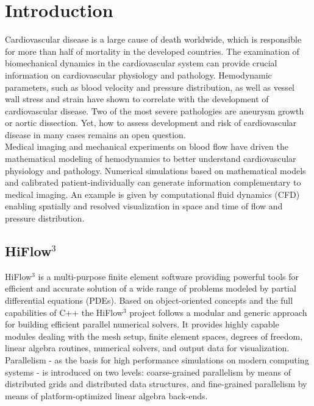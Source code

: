 \documentclass[a4paper, 11pt, twoside]{article}
\begin{document}
\pagestyle{empty}


\tableofcontents

\newpage
\pagestyle{plain}
\vspace{0.5cm}
\section{Introduction}
Cardiovascular disease is a large cause of death worldwide,
which is responsible for more than half of mortality in the developed
countries. The examination of biomechanical dynamics in the
cardiovascular system can provide crucial information on cardiovascular
physiology and pathology. Hemodynamic parameters, such as blood velocity
and pressure distribution, as well as vessel wall stress and strain have
shown to correlate with the development of cardiovascular disease. Two
of the most severe pathologies are aneurysm growth or aortic dissection.
Yet, how to assess development and risk of cardiovascular disease in
many cases remains an open question.\\

Medical imaging and mechanical experiments on blood flow have driven the
mathematical modeling of hemodynamics to better understand
cardiovascular physiology and pathology. Numerical simulations based on
mathematical models and calibrated patient-individually can generate
information complementary to medical imaging. An example is
given by computational fluid dynamics (CFD) enabling spatially and resolved visualization
in space and time of flow and pressure distribution.

\subsection{HiFlow$^3$}
HiFlow$^3$ is a multi-purpose finite element software providing powerful tools for efficient and accurate solution of 
a wide range of problems modeled by partial differential equations (PDEs). Based on object-oriented concepts and the full
capabilities of C++ the HiFlow$^3$ project follows a modular and generic approach for building efficient parallel 
numerical solvers. It provides highly capable modules dealing with the mesh setup, finite element spaces, degrees 
of freedom, linear algebra routines, numerical solvers, and output data for visualization. Parallelism - 
as the basis for high performance simulations on modern computing systems - is introduced on two levels: 
coarse-grained parallelism by means of distributed grids and distributed data structures, and fine-grained parallelism
by means of platform-optimized linear algebra back-ends.
\end{document}
